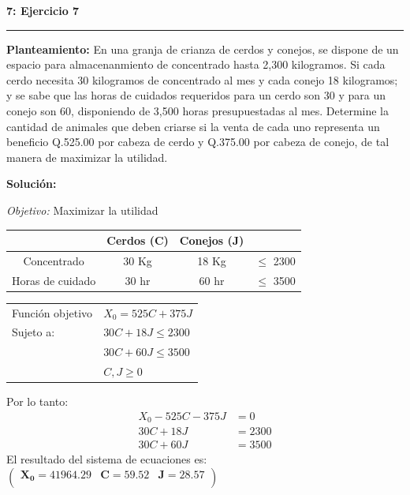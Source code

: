\documentclass[11pt]{article}
\newcommand\problema[2]{\vspace{.01in}\textbf{#1: #2}\vspace{.5em}\hrule\vspace{.10in}}
\newcommand\planteamiento{\vspace{.10in}\textbf{Planteamiento: }}
\newcommand\solucion{\vspace{.10in}\textbf{Solución: }}
\newcommand\obj{\vspace{.10in}\textit{Objetivo: }}
\begin{document}
\pagebreak

\problema{7}{Ejercicio 7}
\planteamiento
En una granja de crianza de cerdos y conejos, se dispone de un espacio para almacenanmiento de concentrado hasta 2,300 kilogramos. Si cada cerdo necesita 30 kilogramos de concentrado al mes y cada conejo 18 kilogramos; y se sabe que las horas de cuidados requeridos para un cerdo son 30 y para un conejo son 60, disponiendo de 3,500 horas presupuestadas al mes. Determine la cantidad de animales que deben criarse si la venta de cada uno representa un beneficio Q.525.00 por cabeza de cerdo y Q.375.00 por cabeza de conejo, de tal manera de maximizar la utilidad.

\solucion

\obj Maximizar la utilidad

\begin{tabular}{|c|c|c|c|}
\hline 
 & Cerdos (C) & Conejos (J) &  \\ 
\hline 
Concentrado & 30 Kg & 18 Kg & $\leq$ 2300 \\ 
\hline 
Horas de cuidado & 30 hr & 60 hr & $\leq$ 3500 \\ 
\hline 
\end{tabular}

\begin{table}[h]
\begin{tabular}{ll}
Función objetivo & $X_0 = 525C+375J$    \\
Sujeto a:        & $30C + 18J \leq 2300$ \\
                 & $30C + 60J \leq 3500$ \\
                 & $C,J \geq 0$    
\end{tabular}
\end{table}

Por lo tanto:
\begin{align*}
X_0 - 525C - 375J &= 0\\
30C + 18J &= 2300\\
30C + 60J &= 3500
\end{align*}
El resultado del sistema de ecuaciones es:
\begin{math}
\mathbf{\left(\begin{array}{rrr}X_0=41964.29&C=59.52&J=28.57\\\end{array}\right)}
\end{math}
\end{document}
